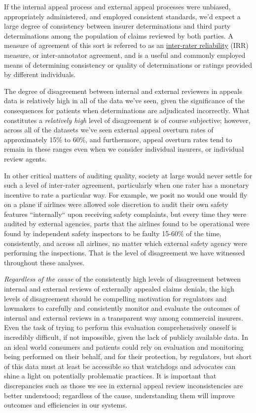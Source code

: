 \documentclass[12pt, a4paper,twoside,parskip=full]{report}
\theoremstyle{plain} %
\theoremstyle{definition} %
\theoremstyle{remark} %
\numberwithin{equation}{chapter}
\begin{document}
		If the internal appeal process and external appeal processes were unbiased, appropriately administered, and employed consistent standards, we'd expect a large degree of consistency between insurer determinations and third party determinations
		among the population of claims reviewed by both parties. A measure of agreement of this sort is referred to as an \href{https://en.wikipedia.org/wiki/Inter-rater_reliability}{inter-rater reliability} (IRR) measure,
		or inter-annotator agreement, and is a useful and commonly employed means of determining consistency or quality of determinations or ratings provided
		by different individuals.
		
		The degree of disagreement between internal and external reviewers in appeals data is relatively high in all of the data we've seen, given the significance of the consequences for patients when determinations are adjudicated incorrectly. What constitutes a \emph{relatively high} level of disagreement is of course subjective; however, across all of the datasets we've seen external appeal overturn rates of approximately 15\% to 60\%, and furthermore, appeal overturn rates tend to remain in these ranges even when we consider individual insurers, or individual review agents.
		
		In other critical matters
		of auditing quality, society at large would never settle for such a level of inter-rater agreement, particularly when one rater has a monetary incentive to rate a particular way.
		For example, we posit no would one would fly on a plane if airlines were allowed sole discretion to audit their
		own safety features ``internally`` upon receiving safety complaints, but every time they were audited by external agencies, parts that the airlines found to be operational were found by independent safety inspectors
		to be faulty 15-60\% of the time, consistently, and across all airlines, no matter which external safety agency were performing the inspections.
		That is the level of disagreement we have witnessed throughout these analyses.
		
		
		\emph{Regardless of the cause} of the consistently high levels of disagreement between internal and external reviews of externally 
		appealed claims denials, the high levels of disagreement should be compelling motivation for regulators and lawmakers to carefully and consistently monitor and evaluate the
		outcomes of internal and external reviews in a transparent way among commercial insurers. Even the task of trying to perform this evaluation comprehensively oneself is incredibly difficult, if not impossible,
		given the lack of publicly available data. In an ideal world consumers and patients could rely on evaluation and monitoring being performed on their behalf, and for their protection,
		by regulators, but short of this data must at least be accessible so that watchdogs and advocates can shine a light on potentially problematic practices. 
		It is important that discrepancies such as those we see in external appeal review inconsistencies are better understood; regardless of the cause, understanding them will
		improve outcomes and efficiencies in our systems.
		
\end{document}

